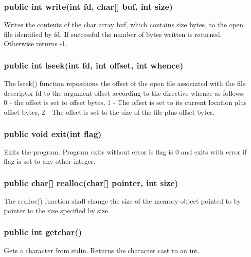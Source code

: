 \begin{homeworkProblem}
    \subsubsection{public int write(int fd, char[] buf, int size)}
    Writes the contents of the char array buf, which contains size bytes, to the open file identified by fd. If successful the number of bytes written is returned. Otherwise returns -1.
    \subsubsection{public int lseek(int fd, int offset, int whence)}
    The lseek() function repositions the offset of the open file associated with the file descriptor fd to the argument offset according to the directive whence as follows: 0 - the offset is set to offset bytes, 1 - The offset is set to its current location plus offset bytes, 2 - The offset is set to the size of the file plus offset bytes.
    \subsubsection{public void exit(int flag)}
    Exits the program. Program exits without error is flag is 0 and exits with error if flag is set to any other integer.
    \subsubsection{public char[] realloc(char[] pointer, int size)}
    The realloc() function shall change the size of the memory object pointed to by pointer to the size specified by size.
    \subsubsection{public int getchar()}
    Gets a character from stdin. Returns the character cast to an int.
    

\end{homeworkProblem}
